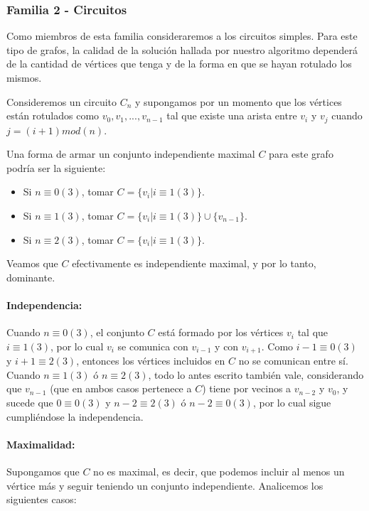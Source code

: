 \subsubsection*{Familia 2 - Circuitos}

Como miembros de esta familia consideraremos a los circuitos simples.  Para este tipo de grafos, la calidad de la solución hallada por nuestro algoritmo dependerá de la cantidad de vértices que tenga y de la forma en que se hayan rotulado los mismos.

Consideremos un circuito $C_{n}$ y supongamos por un momento que los vértices están rotulados como $v_0,v_1,...,v_{n-1}$ tal que existe una arista entre $v_i$ y $v_j$ cuando $j = (i+1) mod (n)$.

Una forma de armar un conjunto independiente maximal $C$ para este grafo podría ser la siguiente:

\begin{itemize}
\item Si $n \equiv 0 (3)$, tomar $C = \{v_i | i \equiv 1 (3)\}$.
\item Si $n \equiv 1 (3)$, tomar $C = \{v_i | i \equiv 1 (3)\} \cup \{v_{n-1}\}$.
\item Si $n \equiv 2 (3)$, tomar $C = \{v_i | i \equiv 1 (3)\}$.
\end{itemize}

Veamos que $C$ efectivamente es independiente maximal, y por lo tanto, dominante.

\paragraph*{Independencia:} Cuando $n \equiv 0 (3)$, el conjunto $C$ está formado por los vértices $v_i$ tal que $i \equiv 1 (3)$, por lo cual $v_i$ se comunica con $v_{i-1}$ y con $v_{i+1}$. Como $i-1 \equiv 0 (3)$ y $i+1 \equiv 2 (3)$, entonces los vértices incluidos en $C$ no se comunican entre sí. Cuando $n \equiv 1 (3)$ ó $n \equiv 2 (3)$, todo lo antes escrito también vale, considerando que $v_{n-1}$ (que en ambos casos pertenece a $C$) tiene por vecinos a $v_{n-2}$ y $v_{0}$, y sucede que $0 \equiv 0 (3)$ y $n-2 \equiv 2 (3)$ ó $n-2 \equiv 0 (3)$, por lo cual sigue cumpliéndose la independencia.

\paragraph*{Maximalidad:} Supongamos que $C$ no es maximal, es decir, que podemos incluir al menos un vértice más y seguir teniendo un conjunto independiente. Analicemos los siguientes casos:

